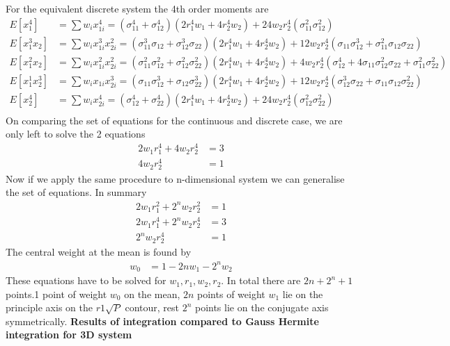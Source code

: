 \documentclass{article}
\begin{document}
 For the equivalent discrete system the 4th order moments are
 \begin{align*}
E[x_1^4]&=\sum{w_ix_{1i}^4}=(\sigma_{11}^4+\sigma_{12}^4)(2 r_1^4 w_1 + 4 r_2^4 w_2)+24 w_2 r_2^4 (\sigma_{11}^2 \sigma_{12}^2)\\
E[x_1^3x_2]&=\sum{w_ix_{1i}^3x_{2i}^2}=(\sigma_{11}^3 \sigma_{12}+ \sigma_{12}^3 \sigma_{22})(2 r_1^4 w_1 + 4 r_2^4 w_2)+12 w_2 r_2^4(\sigma_{11} \sigma_{12}^3  + \sigma_{11}^2 \sigma_{12} \sigma_{22}) \\
E[x_1^2x_2]&=\sum{w_ix_{1i}^2x_{2i}^2}=(\sigma_{11}^2 \sigma_{12}^2+ \sigma_{12}^2 \sigma_{22}^2) (2 r_1^4 w_1 + 4 r_2^4 w_2)+4 w_2 r_2^4 (\sigma_{12}^4  + 4 \sigma_{11} \sigma_{12}^2 \sigma_{22} + \sigma_{11}^2 \sigma_{22}^2)  \\
E[x_1^1x_2^3]&=\sum{w_ix_{1i}x_{2i}^3}=(\sigma_{11} \sigma_{12}^3+\sigma_{12} \sigma_{22}^3) (2 r_1^4 w_1 + 4 r_2^4 w_2)+12 w_2 r_2^4(\sigma_{12}^3 \sigma_{22}  + \sigma_{11} \sigma_{12} \sigma_{22}^2)   \\
E[x_2^4]&=\sum{w_ix_{2i}^4}=(\sigma_{12}^4+\sigma_{22}^4)(2 r_1^4 w_1 + 4 r_2^4 w_2)+24 w_2 r_2^4 (\sigma_{12}^2 \sigma_{22}^2 )\\ 
 \end{align*}
 On comparing the set of equations for the continuous and discrete case, we are only left to solve the 2 equations
  \begin{align}
 2w_1r_1^4+4w_2r_2^4&=3\\
 4w_2r_2^4&=1
 \end{align}
 Now if we apply the same procedure to n-dimensional system we can generalise the set of equations. In summary 
 \begin{align}
 2w_1r_1^2+2^nw_2r_2^2&=1\\
  2w_1r_1^4+2^nw_2r_2^4&=3\\
 2^nw_2r_2^4&=1
 \end{align}
 The central weight at the mean is found by
 \begin{align}
 w_0&=1-2nw_1-2^nw_2
 \end{align}
 These equations have to be solved for $w_1,r_1,w_2,r_2$. In total there are $2n+2^n+1$ points.1 point of weight $w_0$ on the mean, $2n$ points of weight $w_1$ lie on the principle axis on the $r1\sqrt{P}$ contour, rest $2^n$ points lie on the conjugate axis symmetrically. \newline\newline
{\bf Results of integration compared to Gauss Hermite integration for 3D system}\newline\newline
\end{document}
